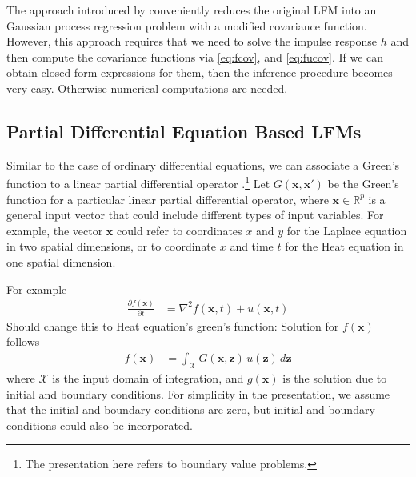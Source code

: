 \documentclass[journal]{IEEEtran}
\newcommand{\simo}[1]{{\color{red}#1}}
\begin{document}
The approach introduced by
\cite{Alvarez+Lawrence:2009,Alvarez+Luengo+Lawrence:2013} conveniently
reduces the original LFM into an Gaussian process regression problem
with a modified covariance function. However, this approach requires
that we need to solve the impulse response $h$ and then compute the
covariance functions via \eqref{eq:fcov}, and \eqref{eq:fucov}.  If we can obtain closed form
expressions for them, then the inference procedure becomes very
easy. Otherwise numerical computations are needed.


\subsection{Partial Differential Equation Based LFMs}
%
Similar to the case of ordinary differential equations, we can associate a Green's function to a linear partial differential
operator \cite{Myintu:LPDEBook:2006, Polyanin:Handbook02}.\footnote{The presentation here refers to boundary value
problems.}
Let $G(\mathbf{x}, \mathbf{x}')$ be the Green's function for a
particular linear partial differential operator, where $\mathbf{x}\in\mathbb{R}^p$ is a general input vector that could
include different types of input variables. For example, the vector $\mathbf{x}$ could refer to
coordinates $x$ and $y$ for the Laplace equation in two spatial dimensions, or to coordinate $x$ and time
$t$ for the Heat equation in one spatial dimension.

For example
\begin{align*}
  \frac{\partial f(\mathbf{x})}{\partial t} &= \nabla^2 f(\mathbf{x},t) + u(\mathbf{x},t)
\end{align*}
%
\simo{Should change this to Heat equation's green's function:}
Solution for $f(\mathbf{x})$ follows
\begin{align*}
f(\mathbf{x}) & = \int_{\mathcal{X}}G(\mathbf{x},  \mathbf{z})\,
                u(\mathbf{z})\,d\mathbf{z}
\end{align*}
where $\mathcal{X}$ is the input domain of integration, and
$g(\mathbf{x})$ is the solution due to initial and boundary
conditions. For simplicity in the presentation, we assume that the
initial and boundary conditions are zero, but initial and boundary conditions could also be incorporated.
\end{document}
